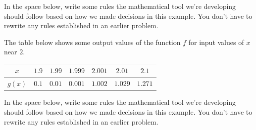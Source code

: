 \documentclass[10pt]{article}
\begin{document}
In the space below, write some rules the mathematical tool we're developing should follow based on how we made decisions in this example. You don't have to rewrite any rules established in an earlier problem.




The table below shows some output values of the function $f$ for input values of $x$ near $2$. 
\begin{center}
\begin{tabular}{| c || c c c c c c |}
\hline
 $x$  & $1.9$ & $1.99$ & $1.999$ & $2.001$ & $2.01$ & $2.1$\\ 
 \hline
 $g(x)$ & $0.1$ & $0.01$  & $0.001$ & $1.002$   & $1.029$  & $1.271$\\
 \hline
\end{tabular}
\end{center}



In the space below, write some rules the mathematical tool we're developing should follow based on how we made decisions in this example. You don't have to rewrite any rules established in an earlier problem.
\end{document}
